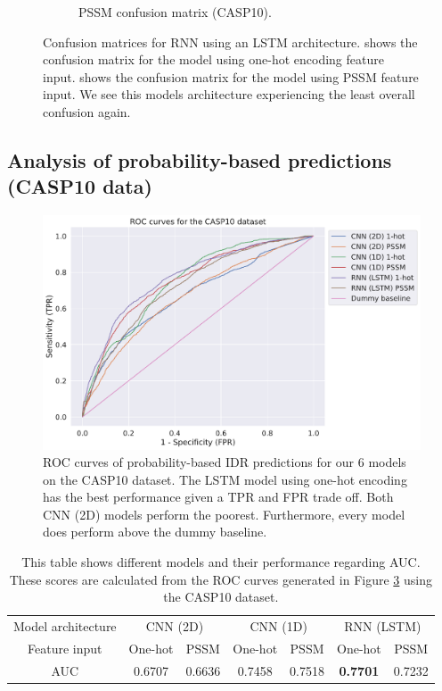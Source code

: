 \documentclass{l4proj}
\begin{document}
\begin{figure}[!htb]
\begin{subfigure}[b]{0.48\textwidth}
        \caption{PSSM confusion matrix (CASP10).}
        \label{fig:caspcfrnnpssm}
    \end{subfigure}
    \caption{Confusion matrices for RNN using an LSTM architecture.  shows the confusion matrix for the model using one-hot encoding feature input.  shows the confusion matrix for the model using PSSM feature input. We see this models architecture experiencing the least overall confusion again.}
    \label{fig:caspcfrnn}
\end{figure}

\subsection{Analysis of probability-based predictions (CASP10 data)}

\begin{figure}[!htb]
    \centering
    \includegraphics[width=0.95\linewidth]{images/CASPROC.pdf}    

    \caption{ROC curves of probability-based IDR predictions for our 6 models on the CASP10 dataset. The LSTM model using one-hot encoding has the best performance given a TPR and FPR trade off. Both CNN (2D) models perform the poorest. Furthermore, every model does perform above the dummy baseline.}

    \label{fig:roccasp} 
\end{figure}

\begin{table}[!htb]
    \centering
    \caption{This table shows different models and their performance regarding AUC. These scores are calculated from the ROC curves generated in Figure \ref{fig:roccasp} using the CASP10 dataset.}
    \begin{tabular}{@{}ccccccc@{}}
    \toprule
    Model architecture & \multicolumn{2}{c}{CNN (2D)} & \multicolumn{2}{c}{CNN (1D)} & \multicolumn{2}{c}{RNN (LSTM)} \\ \cmidrule{0-0}
    Feature input & One-hot & PSSM & One-hot & PSSM & One-hot & PSSM \\ \midrule
    AUC & 0.6707 & 0.6636 & 0.7458 & 0.7518 & \textbf{0.7701} & 0.7232 \\ \bottomrule
    \end{tabular}
    
    \label{tab:auccasp}
\end{table}
\end{document}
